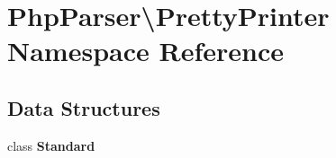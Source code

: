 \section{Php\+Parser\textbackslash{}Pretty\+Printer Namespace Reference}
\label{namespace_php_parser_1_1_pretty_printer}
\subsection*{Data Structures}
\begin{DoxyCompactItemize}
\item 
class {\bf Standard}
\end{DoxyCompactItemize}
